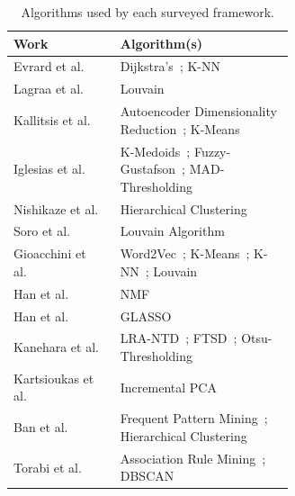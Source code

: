 \documentclass[manuscript,nonacm]{acmart}
\begin{document}
\begin{table}[]
    \small
    \caption{Algorithms used by each surveyed framework.}
    \label{tab:frameworks-algorithms}
    \begin{tabular}{lp{0.62\linewidth}}
        \toprule
        \textbf{Work} & \textbf{Algorithm(s)} \\
        \midrule
        Evrard et al.~\cite{2019evrard}                        & Dijkstra's~\cite{1959dijkstra}; K-NN~\cite{1967cover,1989fix} \\
        Lagraa et al.~\cite{2017lagraa,2019lagraa}             & Louvain~\cite{2006newman,2008blondel} \\
        Kallitsis et al.~\cite{2022kallitsis}                  & Autoencoder Dimensionality Reduction~\cite{2006hinton}; K-Means~\cite{1967macqueen} \\
        Iglesias et al.~\cite{2019iglesias}                    & K-Medoids~\cite{2009park}; Fuzzy-Gustafson~\cite{1999krishnapuram}; MAD-Thresholding~\cite{2004liu} \\
        Nishikaze et al.~\cite{2015nishikaze}                  & Hierarchical Clustering~\cite{2012murtagh} \\
        Soro et al.~\cite{2020soro}                            & Louvain Algorithm~\cite{2006newman,2008blondel} \\
        Gioacchini et al.~\cite{2021gioacchini,2023gioacchini} & Word2Vec~\cite{2013mikolov}; K-Means~\cite{1967macqueen}; K-NN~\cite{1967cover,1989fix}; Louvain~\cite{2006newman,2008blondel} \\
        Han et al.~\cite{2021han,2022han}                      & NMF~\cite{2000lee} \\
        Han et al.~\cite{2020han,2022han}                      & GLASSO~\cite{2008friedman} \\
        Kanehara et al.~\cite{2019kanehara,2022han}            & LRA-NTD~\cite{2015zhou}; FTSD~\cite{2010caiafa}; Otsu-Thresholding~\cite{1979otsu} \\
        Kartsioukas et al.~\cite{2023kartsioukas}              & Incremental PCA~\cite{2012arora} \\
        Ban et al.~\cite{2016ban}                              & Frequent Pattern Mining~\cite{2000han,2007han}; Hierarchical Clustering~\cite{2012murtagh} \\
        Torabi et al.~\cite{2020torabi,2018torabi}             & Association Rule Mining~\cite{1993agrawal}; DBSCAN~\cite{1996ester} \\

\end{tabular}
\end{table}
\end{document}
